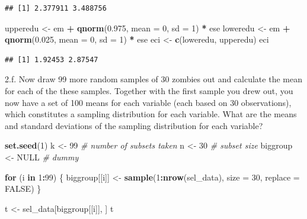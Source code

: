 \documentclass[]{article}
\newenvironment{Shaded}{\begin{snugshade}}{\end{snugshade}}
\newcommand{\KeywordTok}[1]{\textcolor[rgb]{0.13,0.29,0.53}{\textbf{#1}}}
\newcommand{\DataTypeTok}[1]{\textcolor[rgb]{0.13,0.29,0.53}{#1}}
\newcommand{\DecValTok}[1]{\textcolor[rgb]{0.00,0.00,0.81}{#1}}
\newcommand{\FloatTok}[1]{\textcolor[rgb]{0.00,0.00,0.81}{#1}}
\newcommand{\StringTok}[1]{\textcolor[rgb]{0.31,0.60,0.02}{#1}}
\newcommand{\CommentTok}[1]{\textcolor[rgb]{0.56,0.35,0.01}{\textit{#1}}}
\newcommand{\OtherTok}[1]{\textcolor[rgb]{0.56,0.35,0.01}{#1}}
\newcommand{\ControlFlowTok}[1]{\textcolor[rgb]{0.13,0.29,0.53}{\textbf{#1}}}
\newcommand{\OperatorTok}[1]{\textcolor[rgb]{0.81,0.36,0.00}{\textbf{#1}}}
\newcommand{\NormalTok}[1]{#1}
\begin{document}
\begin{verbatim}
## [1] 2.377911 3.488756
\end{verbatim}

\begin{Shaded}
\begin{Highlighting}[]
\NormalTok{upperedu <-}\StringTok{ }\NormalTok{em }\OperatorTok{+}\StringTok{ }\KeywordTok{qnorm}\NormalTok{(}\FloatTok{0.975}\NormalTok{, }\DataTypeTok{mean =} \DecValTok{0}\NormalTok{, }\DataTypeTok{sd =} \DecValTok{1}\NormalTok{) }\OperatorTok{*}\StringTok{ }\NormalTok{ese}
\NormalTok{loweredu <-}\StringTok{ }\NormalTok{em }\OperatorTok{+}\StringTok{ }\KeywordTok{qnorm}\NormalTok{(}\FloatTok{0.025}\NormalTok{, }\DataTypeTok{mean =} \DecValTok{0}\NormalTok{, }\DataTypeTok{sd =} \DecValTok{1}\NormalTok{) }\OperatorTok{*}\StringTok{ }\NormalTok{ese }
\NormalTok{eci <-}\StringTok{ }\KeywordTok{c}\NormalTok{(loweredu, upperedu)}
\NormalTok{eci}
\end{Highlighting}
\end{Shaded}

\begin{verbatim}
## [1] 1.92453 2.87547
\end{verbatim}

2.f. Now draw 99 more random samples of 30 zombies out and calculate the
mean for each of the these samples. Together with the first sample you
drew out, you now have a set of 100 means for each variable (each based
on 30 observations), which constitutes a sampling distribution for each
variable. What are the means and standard deviations of the sampling
distribution for each variable?

\begin{Shaded}
\begin{Highlighting}[]
\KeywordTok{set.seed}\NormalTok{(}\DecValTok{1}\NormalTok{)}
\NormalTok{k <-}\StringTok{ }\DecValTok{99}  \CommentTok{# number of subsets taken}
\NormalTok{n <-}\StringTok{ }\DecValTok{30}  \CommentTok{# subset size}
\NormalTok{biggroup <-}\StringTok{ }\OtherTok{NULL}  \CommentTok{# dummy}

\ControlFlowTok{for}\NormalTok{ (i }\ControlFlowTok{in} \DecValTok{1}\OperatorTok{:}\DecValTok{99}\NormalTok{) \{}
\NormalTok{  biggroup[[i]] <-}\StringTok{ }\KeywordTok{sample}\NormalTok{(}\DecValTok{1}\OperatorTok{:}\KeywordTok{nrow}\NormalTok{(sel_data), }\DataTypeTok{size =} \DecValTok{30}\NormalTok{, }\DataTypeTok{replace =} \OtherTok{FALSE}\NormalTok{)}
\NormalTok{\}}

\NormalTok{t <-}\StringTok{ }\NormalTok{sel_data[biggroup[[i]], ]}
\NormalTok{t}
\end{Highlighting}
\end{Shaded}
\end{document}
